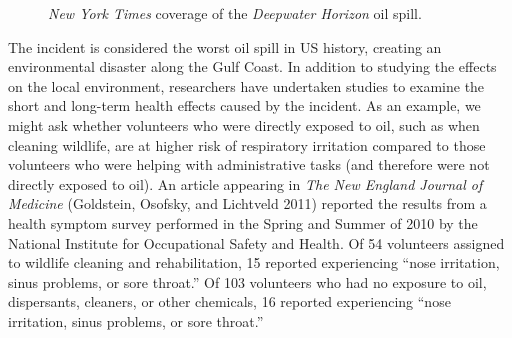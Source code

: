 \documentclass[
  letterpaper,
  DIV=11,
  numbers=noendperiod]{scrreprt}
\theoremstyle{definition}
\theoremstyle{definition}
\theoremstyle{plain}
\theoremstyle{remark}
\begin{document}
\begin{figure}


\caption{\label{fig-casedeepwater-nytclip}\emph{New York Times} coverage
of the \emph{Deepwater Horizon} oil spill.}

\end{figure}%

The incident is considered the worst oil spill in US history, creating
an environmental disaster along the Gulf Coast. In addition to studying
the effects on the local environment, researchers have undertaken
studies to examine the short and long-term health effects caused by the
incident. As an example, we might ask whether volunteers who were
directly exposed to oil, such as when cleaning wildlife, are at higher
risk of respiratory irritation compared to those volunteers who were
helping with administrative tasks (and therefore were not directly
exposed to oil). An article appearing in \emph{The New England Journal
of Medicine} (Goldstein, Osofsky, and Lichtveld 2011) reported the
results from a health symptom survey performed in the Spring and Summer
of 2010 by the National Institute for Occupational Safety and Health. Of
54 volunteers assigned to wildlife cleaning and rehabilitation, 15
reported experiencing ``nose irritation, sinus problems, or sore
throat.'' Of 103 volunteers who had no exposure to oil, dispersants,
cleaners, or other chemicals, 16 reported experiencing ``nose
irritation, sinus problems, or sore throat.''
\end{document}
